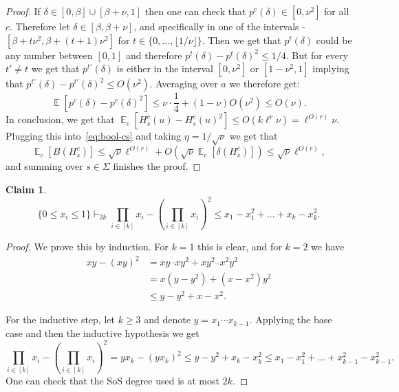 \documentclass[11pt]{article}
\DeclareMathOperator*{\E}{\mathbb{E}}
\DeclareMathOperator*{\pE}{\widetilde{\mathbb{E}}}
\DeclareMathOperator*{\pPr}{\widetilde{\Pr}}
\def \A {\mathcal{A}}
\newtheorem{lemma}[theorem]{Lemma}
\newtheorem{claim}[theorem]{Claim}
\theoremstyle{definition}
\begin{document}
\begin{proof}
If $\delta \in [0,\beta] \cup [\beta+\nu, 1]$ then one can check that $p^c(\delta) \in [0,\nu^2]$ for all $c$. Therefore let $\delta \in [\beta,\beta+\nu]$, and specifically in one of the intervals - $[\beta+t\nu^2, \beta+(t+1)\nu^2]$ for $t \in \{0,\ldots,\lfloor1/\nu\rfloor\}$. Then we get that $p^t(\delta)$ could be any number between $[0,1]$ and therefore $p^t(\delta)-p^t(\delta)^2 \leq 1/4$. But for every $t' \neq t$ we get that $p^{t'}(\delta)$ is either in the interval $[0,\nu^2]$ or $[1-\nu^2,1]$ implying that $p^{t'}(\delta) - p^{t'}(\delta)^2 \leq O(\nu^2)$. Averaging over $a$ we therefore get:
\[\E[p^c(\delta) - p^c(\delta)^2] \leq \nu \cdot \frac{1}{4}+ (1-\nu)O(\nu^2) \leq O(\nu).\]
In conclusion, we get that 
$\E_c[H_s^c(u) - H_s^c(u)^2]\leq O(k\ell^r\nu) = \ell^{O(r)}\nu$. Plugging this into~\eqref{eq:bool-cs} 
and taking $\eta = 1/\sqrt{\nu}$ we get that
\[\E_c[B(H^c_s)] \leq  \sqrt{\nu}\ell^{O(r)} + O(\sqrt{\nu}\E_c[\delta(H^c_s)]) \leq \sqrt{\nu}\ell^{O(r)},\]
and summing over $s \in \Sigma$ finishes the proof.
\end{proof}

\begin{claim}\label{claim:silly_sos}
\[
\{0 \leq x_i \leq 1\} \vdash_{2k} 
\prod_{i \in [k]}x_i - (\prod_{i \in [k]}x_i)^2 \leq x_1-x_1^2 + \ldots + x_k - x_k^2. 
\]
\end{claim}
\begin{proof}
We prove this by induction. For $k=1$ this is clear, and for $k=2$ we have
\begin{align*}
xy - (xy)^2 &= xy – xy^2 + xy^2 – x^2 y^2 \\
&= x(y-y^2)+ (x-x^2) y^2 \\
&\leq y-y^2 + x-x^2.    
\end{align*}

For the inductive step, let $k\geq 3$ and denote $y=x_1\cdots x_{k-1}$. Applying the base case and 
then the inductive hypothesis we get
\[\prod_{i \in [k]}x_i - \left(\prod_{i \in [k]}x_i\right)^2 
=y x_k - (y x_k)^2
\leq y-y^2 + x_k-x_k^2
\leq x_1 - x_1^2 + \ldots + x_{k-1}^2 - x_{k-1}^2.
\]
One can check that the SoS degree used is at most $2k$.
\end{proof}





\end{document}
